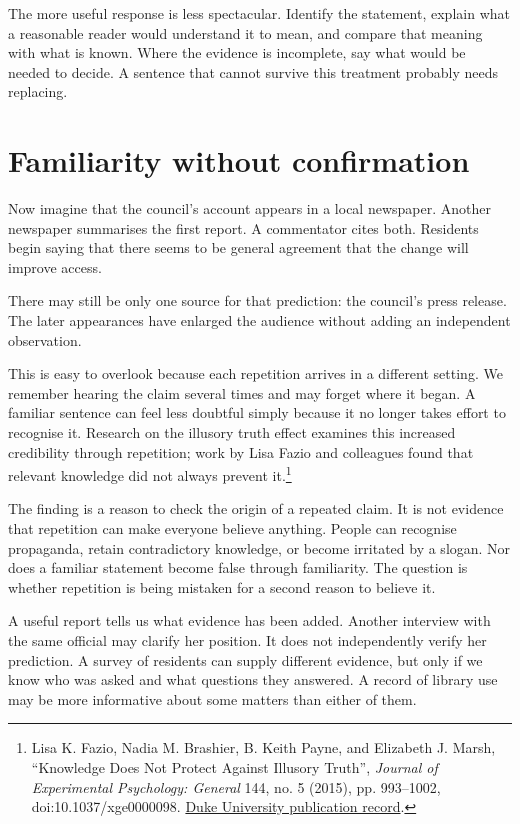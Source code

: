 \documentclass[12pt,a4paper]{book}
\begin{document}
The more useful response is less spectacular. Identify the statement, explain what a reasonable reader would understand it to mean, and compare that meaning with what is known. Where the evidence is incomplete, say what would be needed to decide. A sentence that cannot survive this treatment probably needs replacing.

\section*{Familiarity without confirmation}

Now imagine that the council's account appears in a local newspaper. Another newspaper summarises the first report. A commentator cites both. Residents begin saying that there seems to be general agreement that the change will improve access.

There may still be only one source for that prediction: the council's press release. The later appearances have enlarged the audience without adding an independent observation.

This is easy to overlook because each repetition arrives in a different setting. We remember hearing the claim several times and may forget where it began. A familiar sentence can feel less doubtful simply because it no longer takes effort to recognise it. Research on the illusory truth effect examines this increased credibility through repetition; work by Lisa Fazio and colleagues found that relevant knowledge did not always prevent it.\footnote{Lisa K. Fazio, Nadia M. Brashier, B. Keith Payne, and Elizabeth J. Marsh, ``Knowledge Does Not Protect Against Illusory Truth'', \emph{Journal of Experimental Psychology: General} 144, no. 5 (2015), pp. 993--1002, doi:10.1037/xge0000098. \href{https://scholars.duke.edu/publication/1090926}{Duke University publication record}.}

The finding is a reason to check the origin of a repeated claim. It is not evidence that repetition can make everyone believe anything. People can recognise propaganda, retain contradictory knowledge, or become irritated by a slogan. Nor does a familiar statement become false through familiarity. The question is whether repetition is being mistaken for a second reason to believe it.

A useful report tells us what evidence has been added. Another interview with the same official may clarify her position. It does not independently verify her prediction. A survey of residents can supply different evidence, but only if we know who was asked and what questions they answered. A record of library use may be more informative about some matters than either of them.
\end{document}
